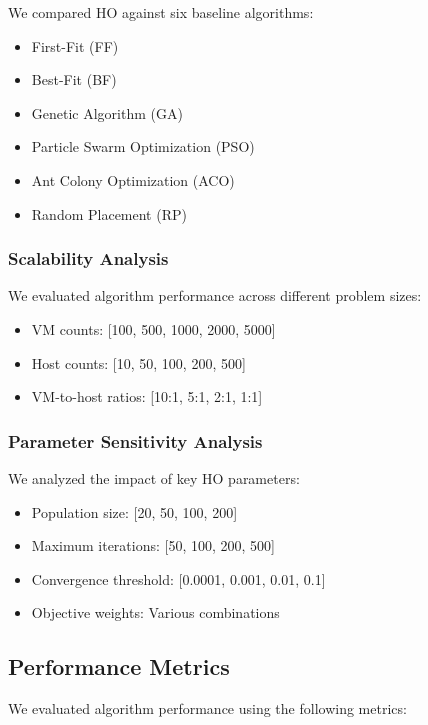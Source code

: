 \documentclass[conference]{IEEEtran}
\begin{document}
We compared HO against six baseline algorithms:
\begin{itemize}
    \item First-Fit (FF)
    \item Best-Fit (BF)
    \item Genetic Algorithm (GA)
    \item Particle Swarm Optimization (PSO)
    \item Ant Colony Optimization (ACO)
    \item Random Placement (RP)
\end{itemize}

\subsubsection{Scalability Analysis}

We evaluated algorithm performance across different problem sizes:
\begin{itemize}
    \item VM counts: [100, 500, 1000, 2000, 5000]
    \item Host counts: [10, 50, 100, 200, 500]
    \item VM-to-host ratios: [10:1, 5:1, 2:1, 1:1]
\end{itemize}

\subsubsection{Parameter Sensitivity Analysis}

We analyzed the impact of key HO parameters:
\begin{itemize}
    \item Population size: [20, 50, 100, 200]
    \item Maximum iterations: [50, 100, 200, 500]
    \item Convergence threshold: [0.0001, 0.001, 0.01, 0.1]
    \item Objective weights: Various combinations
\end{itemize}

\subsection{Performance Metrics}

We evaluated algorithm performance using the following metrics:
\end{document}
